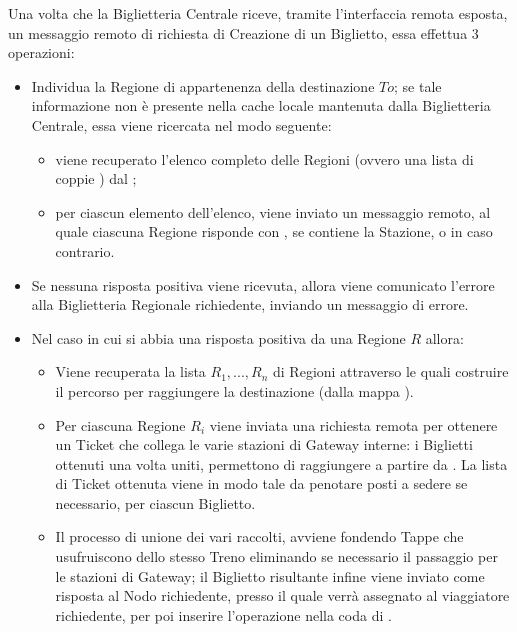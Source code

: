 	
	Una volta che la Biglietteria Centrale riceve, tramite l'interfaccia remota esposta, un messaggio remoto di richiesta di Creazione di un Biglietto, essa effettua 3 operazioni:
	\begin{itemize}
		\item Individua la Regione di appartenenza della destinazione $To$; se tale informazione non è presente nella cache locale mantenuta dalla Biglietteria Centrale, essa viene ricercata nel modo seguente: 
			\begin{itemize}
				\item viene recuperato l'elenco completo delle Regioni (ovvero una lista di coppie ) dal ;
				\item per ciascun elemento dell'elenco, viene inviato un messaggio remoto, al quale ciascuna Regione risponde con , se contiene la Stazione, o  in caso contrario.
			\end{itemize}
		\item Se nessuna risposta positiva viene ricevuta, allora viene comunicato l'errore alla Biglietteria Regionale richiedente, inviando un messaggio di errore.
		\item Nel caso in cui si abbia una risposta positiva da una Regione $R$ allora:
			\begin{itemize}
				\item Viene recuperata la lista $R_1,...,R_n$ di Regioni attraverso le quali costruire il percorso per raggiungere la destinazione (dalla mappa ). 
				\item Per ciascuna Regione $R_i$ viene inviata una richiesta remota  per ottenere un Ticket che collega le varie stazioni di Gateway interne: i Biglietti ottenuti una volta uniti, permettono di raggiungere  a partire da . La lista di Ticket ottenuta viene  in modo tale da penotare posti a sedere se necessario, per ciascun Biglietto.
				\item Il processo di unione dei vari  raccolti, avviene fondendo Tappe che usufruiscono dello stesso Treno eliminando se necessario il passaggio per le stazioni di Gateway; il Biglietto risultante infine viene inviato come risposta al Nodo richiedente, presso il quale verrà assegnato al viaggiatore richiedente, per poi inserire l'operazione  nella coda di .
			\end{itemize}
	\end{itemize}
	
